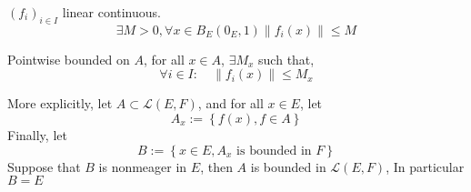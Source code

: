 \begin{definition}
	$(f_{i}) _{i \in I} $  linear continuous.
	\[
	\exists M > 0, \forall x \in  B_{E}(0_{E},1)  
	\| f_{i}(x)  \|  \leq M 
	\]
\end{definition}
\begin{definition}
	Pointwise bounded on $A$, for all $x \in  A $, 
	$\exists M_{x} $  such that,  
	\[
	\forall i \in  I : \quad 
	\| f_{i}(x)  \|  \leq M_{x}
	\]
\end{definition}
More explicitly, let $A \subset \mathcal{L} (E,F)  $, 
and for all $x \in  E $, let 
\[
A_{x} := \left\{ 
f(x) , f \in  A\right\}
\]
Finally, let 
\[
B :=  \left\{ x \in  E, A_{x} \text{ is bounded in } F  \right\}
\]                                                   
Suppose that $B$ is nonmeager in $E $, then 
$A $ is bounded in $\mathcal{L} (E,F)  $,
In particular $B = E $ 
